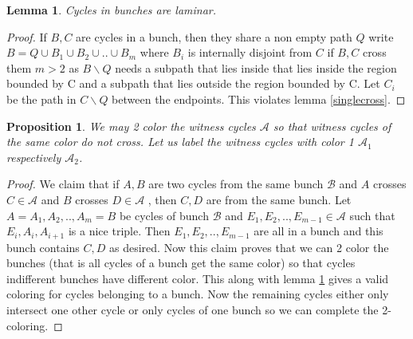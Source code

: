 \documentclass[letterpaper,11pt]{article}
\newtheorem{lemma}[theorem]{Lemma}
\newtheorem{prop}[theorem]{Proposition}
\newcommand{\0}{\mathbb{0}}
\newcommand{\1}{\mathbb{1}}
\begin{document}
\begin{lemma} \label{laminar bunch}
Cycles in bunches are laminar.
\end{lemma}
\begin{proof}
If $B,C $ are cycles in a bunch, then they share a non empty path $Q$  write $B = Q \cup B_1 \cup B_2 \cup .. \cup B_m$  where $B_i$ is internally disjoint from $C$ if $B,C$ cross them $m>2$ as $B \backslash Q$ needs a subpath that lies inside that lies inside the region bounded by C and a subpath that lies outside the region bounded by C.  Let $C_i$ be the path in $C \backslash Q$ between the endpoints. This violates lemma \ref{singlecross}.
\end{proof}


\begin{prop}
We may 2 color the witness cycles $\mathcal{A}$ so that witness cycles of the same color do not cross.  Let us label the witness cycles with color 1 $\mathcal{A}_1$  respectively  $\mathcal{A}_2$.
\end{prop}  
\begin{proof}
We claim that if $A,B$ are two cycles from the same bunch $ \mathcal{B} $ and $A$ crosses $C \in \mathcal{A}$ and $B$ crosses $D \in \mathcal{A}$ , then $C,D$ are from the same bunch. Let $A=A_1, A_2, .., A_m =B $  be cycles of bunch $\mathcal{B}$  and $E_1, E_2,.., E_{m-1} \in \mathcal{A}$ such that $ E_i, A_i, A_{i+1}  $ is a nice triple. Then $E_1, E_2,.., E_{m-1}$  are all in a bunch and this bunch contains $C,D$ as desired.  
Now this claim  proves that we can 2 color the bunches (that is all cycles of a bunch get the same color) so that cycles indifferent bunches have different color. This along with lemma \ref{laminar bunch} gives a valid coloring for cycles belonging to a bunch.  Now the remaining cycles either only intersect one other cycle or only cycles of one bunch so we can complete the 2-coloring.
\end{proof}

\end{document}
